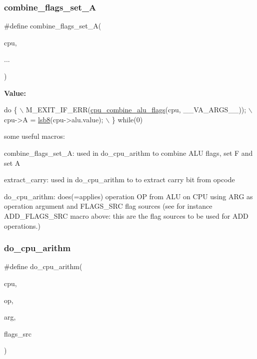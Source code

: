 \subsubsection{\texorpdfstring{combine\+\_\+flags\+\_\+set\+\_\+A}{combine\_flags\_set\_A}}
{\footnotesize\ttfamily \#define combine\+\_\+flags\+\_\+set\+\_\+A(\begin{DoxyParamCaption}\item[{}]{cpu,  }\item[{}]{... }\end{DoxyParamCaption})}

{\bfseries Value\+:}
\begin{DoxyCode}
\textcolor{keywordflow}{do} \{ \(\backslash\)
        M\_EXIT\_IF\_ERR(\hyperlink{cpu-alu_8h_ac780d6a4222a48f38ef077b29ca9dca2}{cpu\_combine\_alu\_flags}(cpu, \_\_VA\_ARGS\_\_)); \(\backslash\)
        cpu->A = \hyperlink{bit_8h_aa7214f9bc705f6d655fafa3a15f672e8}{lsb8}(cpu->alu.value); \(\backslash\)
    \} \textcolor{keywordflow}{while}(0)
\end{DoxyCode}


some useful macros\+: 


\begin{DoxyItemize}
\item combine\+\_\+flags\+\_\+set\+\_\+A\+: used in do\+\_\+cpu\+\_\+arithm to combine A\+LU flags, set F and set A
\item extract\+\_\+carry\+: used in do\+\_\+cpu\+\_\+arithm to to extract carry bit from opcode
\item do\+\_\+cpu\+\_\+arithm\+: does(=applies) operation OP from A\+LU on C\+PU using A\+RG as operation argument and F\+L\+A\+G\+S\+\_\+\+S\+RC flag sources (see for instance A\+D\+D\+\_\+\+F\+L\+A\+G\+S\+\_\+\+S\+RC macro above\+: this are the flag sources to be used for A\+DD operations.) 
\end{DoxyItemize}\mbox{\label{cpu-alu_8h_a17d3fcdb93f05da139232c07b227dbbf}} 
\subsubsection{\texorpdfstring{do\+\_\+cpu\+\_\+arithm}{do\_cpu\_arithm}}
{\footnotesize\ttfamily \#define do\+\_\+cpu\+\_\+arithm(\begin{DoxyParamCaption}\item[{}]{cpu,  }\item[{}]{op,  }\item[{}]{arg,  }\item[{}]{flags\+\_\+src }\end{DoxyParamCaption})}

